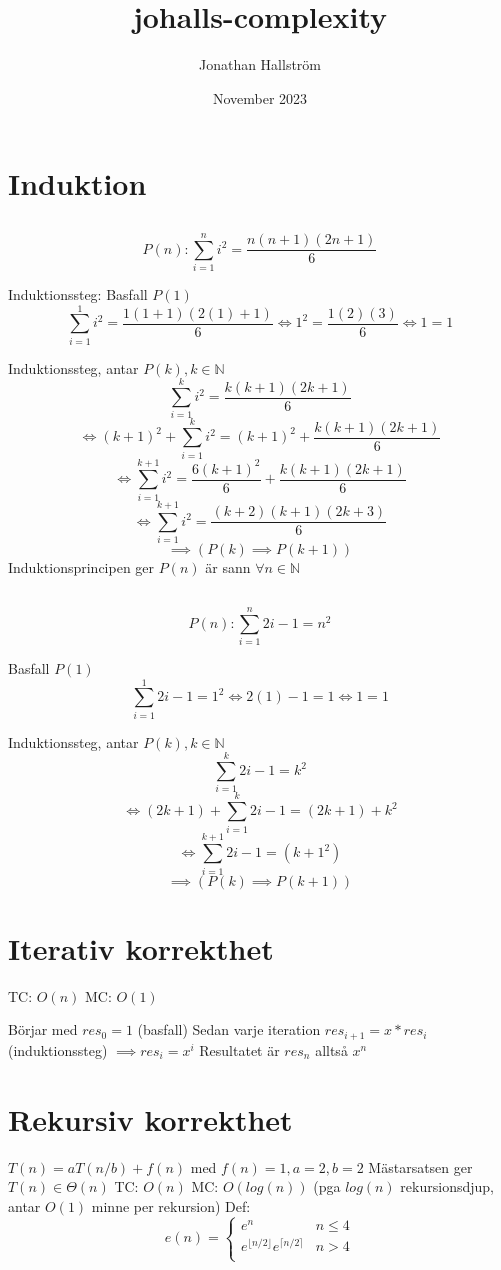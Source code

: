 \documentclass{article}
\title{johalls-complexity}
\author{Jonathan Hallström}
\date{November 2023}
\begin{document}
\maketitle


\section{Induktion}
\subsection{}

$$P(n):  \sum _{i=1}^n i^2=\frac{n(n+1)(2n+1)}{6}$$

Induktionssteg:
Basfall $P(1)$
$$\sum _{i=1}^1 i^2=\frac{1(1+1)(2(1)+1)}{6} \iff 1^2=\frac{1(2)(3)}{6} \iff 1=1$$

Induktionssteg, antar $P(k), k \in \mathbb{N}$
$$\sum _{i=1}^k i^2=\frac{k(k+1)(2k+1)}{6}$$
$$ \iff (k+1)^2 + \sum _{i=1}^k i^2=(k+1)^2+\frac{k(k+1)(2k+1)}{6}$$
$$\iff \sum _{i=1}^{k+1} i^2=\frac{6(k+1)^2}{6}+\frac{k(k+1)(2k+1)}{6}$$
$$\iff \sum _{i=1}^{k+1} i^2=\frac{(k+2)(k+1)(2k+3)}{6}$$
$$\implies (P(k) \implies P(k+1))$$
Induktionsprincipen ger $P(n)$ är sann $\forall n \in \mathbb{N}$

\subsection{}
$$P(n):  \sum _{i=1}^n 2i-1=n^2$$

Basfall $P(1)$
$$\sum _{i=1}^1 2i-1=1^2\iff 2(1)-1=1\iff1=1$$

Induktionssteg, antar $P(k),k \in \mathbb{N}$
$$\sum _{i=1}^k 2i-1=k^2$$
$$\iff (2k+1)+\sum _{i=1}^k 2i-1=(2k+1)+k^2$$
$$\iff \sum _{i=1}^{k+1} 2i-1=(k+1^2)$$
$$\implies (P(k) \implies P(k+1))$$

\section{Iterativ korrekthet}
TC: $O(n)$
MC: $O(1)$

Börjar med $res_0=1$ (basfall)
Sedan varje iteration $res_{i+1}=x*res_i$ (induktionssteg)
$\implies res_i=x^i$
Resultatet är $res_n$ alltså $x^n$

\section{Rekursiv korrekthet}
$T(n) = aT(n/b)+f(n)$ med $f(n)=1,a=2,b=2$
Mästarsatsen ger $T(n) \in\mathbb{\Theta}(n)$
TC: $O(n)$ 
MC: $O(log(n))$ (pga $log(n)$ rekursionsdjup, antar $O(1)$ minne per rekursion)
Def: $$e(n) = \begin{cases}
e^n & n \leq 4 \\
e^{\lfloor n/2 \rfloor}e^{\lceil n/2 \rceil} & n > 4\\
\end{cases}
$$
\end{document}
